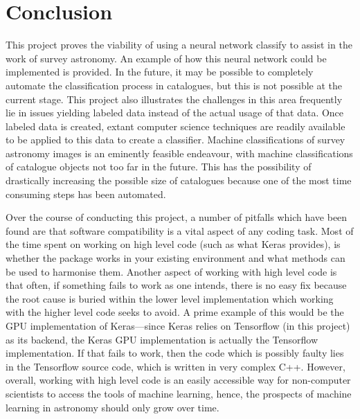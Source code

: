 \documentclass[a4paper,fleqn,usenatbib]{mnras}
\begin{document}
\section{Conclusion}
This project proves the viability of using a neural network classify to assist in the work of survey astronomy. An example of how this neural network could be implemented is provided. In the future, it may be possible to completely automate the classification process in catalogues, but this is not possible at the current stage. This project also illustrates the challenges in this area frequently lie in issues yielding labeled data instead of the actual usage of that data. Once labeled data is created, extant computer science techniques are readily available to be applied to this data to create a classifier. Machine classifications of survey astronomy images is an eminently feasible endeavour, with machine classifications of catalogue objects not too far in the future. This has the possibility of drastically increasing the possible size of catalogues because one of the most time consuming steps has been automated.

Over the course of conducting this project, a number of pitfalls which have been found are that software compatibility is a vital aspect of any coding task. Most of the time spent on working on high level code (such as what Keras provides), is whether the package works in your existing environment and what methods can be used to harmonise them. Another aspect of working with high level code is that often, if something fails to work as one intends, there is no easy fix because the root cause is buried within the lower level implementation which working with the higher level code seeks to avoid. A prime example of this would be the GPU implementation of Keras---since Keras relies on Tensorflow (in this project) as its backend, the Keras GPU implementation is actually the Tensorflow implementation. If that fails to work, then the code which is possibly faulty lies in the Tensorflow source code, which is written in very complex C++. However, overall, working with high level code is an easily accessible way for non-computer scientists to access the tools of machine learning, hence, the prospects of machine learning in astronomy should only grow over time. 

%





\end{document}
